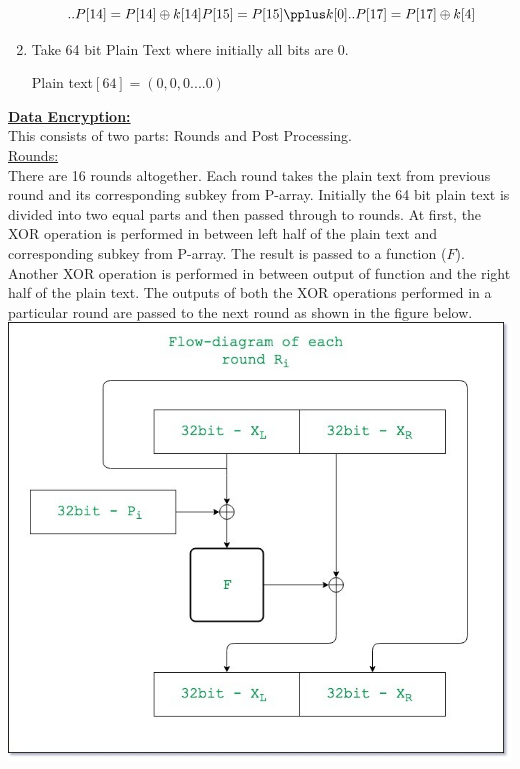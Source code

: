 \documentclass[a4paper]{report} %
\begin{document}
\begin{enumerate}
\begin{equation*}
        .\\
        .\\
        P[14]=P[14] \oplus k[14]\\
        P[15]=P[15] \pplus k[0]\\
        .\\
        .\\
        P[17]=P[17] \oplus k[4]\\
    \end{equation*}
    \item Take 64 bit Plain Text where initially all bits are 0. \\
    \begin{center}
        Plain text$[64]=(0,0,0....0)$
    \end{center}
\end{enumerate}
\textbf{\underline{Data Encryption:}}\\
This consists of two parts: Rounds and Post Processing. \\
\underline{Rounds:}\\
There are 16 rounds altogether. Each round takes the plain text from previous round and its corresponding subkey from P-array. Initially the 64 bit plain text is divided into two equal parts and then passed through to rounds. At first, the XOR operation is performed in between left half of the plain text and corresponding subkey from P-array. The result is passed to a function ($F$). Another XOR operation is performed in between output of function and the right half of the plain text. The outputs of both the XOR operations performed in a particular round are passed to the next round as shown in the figure below. \\
\includegraphics[scale=0.5]{images/round.jpg}\\
\end{document}
